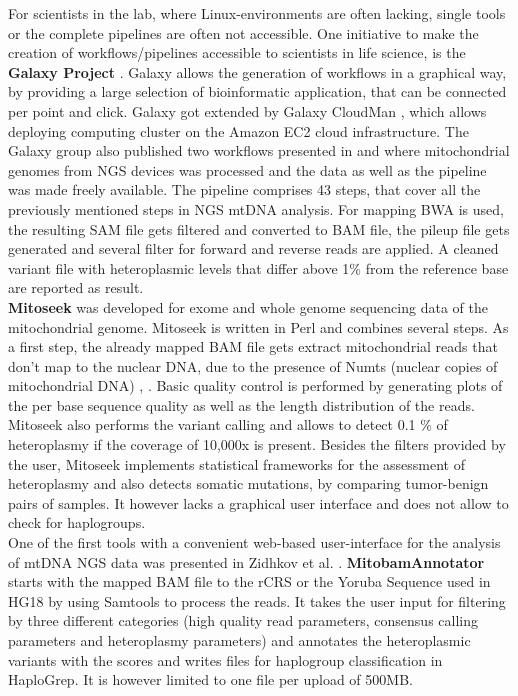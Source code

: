 For scientists in the lab, where Linux-environments are often lacking, single tools or the complete pipelines are often not accessible. One initiative to make the creation of workflows/pipelines accessible to scientists in life science, is the \textbf{Galaxy Project} \cite{Goecks2010,Afgan2016}. Galaxy allows the generation of workflows in a graphical way, by providing a large selection of bioinformatic application, that can be connected per point and click. Galaxy got extended by Galaxy CloudMan \cite{Afgan2010}, which allows deploying computing cluster on the Amazon EC2 cloud infrastructure. The Galaxy group also published two workflows presented in \cite{Goto2011} and \cite{Dickins2014} where mitochondrial genomes from NGS devices was processed and the data as well as the pipeline was made freely available. The pipeline comprises 43 steps, that cover all the previously mentioned steps in NGS mtDNA analysis. For mapping BWA is used, the resulting SAM file gets filtered and converted to BAM file, the pileup file gets generated and several filter for forward and reverse reads are applied. A cleaned variant file with heteroplasmic levels that differ above 1\% from the reference base are reported as result.
\\
\textbf{Mitoseek} \cite{Guo2013} was developed for exome and whole genome sequencing data of the mitochondrial genome. Mitoseek is written in Perl and combines several steps. As a first step, the already mapped BAM file gets extract mitochondrial reads that don't map to the nuclear DNA, due to the presence of Numts (nuclear copies of mitochondrial DNA) \cite{Parr2006}, \cite{Dayama2014}. Basic quality control is performed by generating plots of the per base sequence quality as well as the length distribution of the reads.  Mitoseek also performs the variant calling and allows to detect 0.1 \% of heteroplasmy if the coverage of 10,000x is present. Besides the filters provided by the user, Mitoseek implements statistical frameworks for the assessment of heteroplasmy and also detects somatic mutations, by comparing tumor-benign pairs of samples. It however lacks a graphical user interface and does not allow to check for haplogroups.
\\
One of the first tools with a convenient web-based user-interface for the analysis of mtDNA NGS data was presented in Zidhkov et al. \cite{Zhidkov2011}. \textbf{MitobamAnnotator} starts with the mapped BAM file to the rCRS or the Yoruba Sequence used in HG18 by using Samtools \cite{Li2009} to process the reads. It takes the user input for filtering by three different categories (high quality read parameters, consensus calling parameters and heteroplasmy parameters) and annotates the heteroplasmic variants with the scores and writes files for haplogroup classification in HaploGrep. It is however limited to one file per upload of 500MB. 
